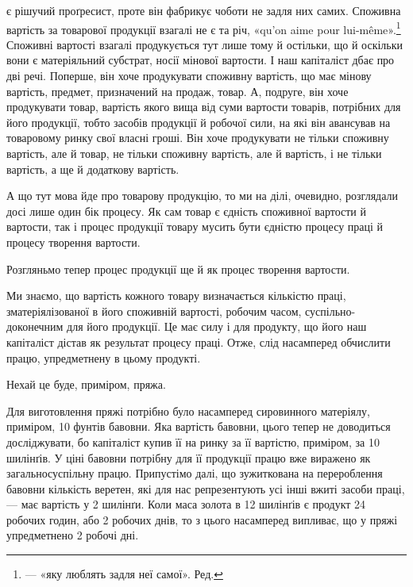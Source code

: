 \parcont{}  %
є рішучий проґресист, проте він фабрикує чоботи не задля них
самих. Споживна вартість за товарової продукції взагалі не є
та річ, «qu’on aime pour lui-même».\footnote*{
— «яку люблять задля неї самої». Ред.
} Споживні вартості взагалі
продукується тут лише тому й остільки, що й оскільки вони є
матеріяльний субстрат, носії мінової вартости. І наш капіталіст
дбає про дві речі. Поперше, він хоче продукувати споживну
вартість, що має мінову вартість, предмет, призначений на продаж,
товар. А, подруге, він хоче продукувати товар, вартість
якого вища від суми вартости товарів, потрібних для його продукції,
тобто засобів продукції й робочої сили, на які він авансував
на товаровому ринку свої власні гроші. Він хоче продукувати
не тільки споживну вартість, але й товар, не тільки споживну
вартість, але й вартість, і не тільки вартість, а ще й додаткову
вартість.

А що тут мова йде про товарову продукцію, то ми на ділі,
очевидно, розглядали досі лише один бік процесу. Як сам товар
є єдність споживної вартости й вартости, так і процес продукції
товару мусить бути єдністю процесу праці й процесу творення
вартости.

Розгляньмо тепер процес продукції ще й як процес творення
вартости.

Ми знаємо, що вартість кожного товару визначається кількістю
праці, зматеріялізованої в його споживній вартості, робочим
часом, суспільно-доконечним для його продукції. Це має силу
і для продукту, що його наш капіталіст дістав як результат процесу
праці. Отже, слід насамперед обчислити працю, упредметнену
в цьому продукті.

Нехай це буде, приміром, пряжа.

Для виготовлення пряжі потрібно було насамперед сировинного
матеріялу, приміром, 10 фунтів бавовни. Яка вартість бавовни,
цього тепер не доводиться досліджувати, бо капіталіст
купив її на ринку за її вартістю, приміром, за 10 шилінґів. У ціні
бавовни потрібну для її продукції працю вже виражено як загальносуспільну
працю. Припустімо далі, що зужиткована на
перероблення бавовни кількість веретен, які для нас репрезентують
усі інші вжиті засоби праці, — має вартість у 2 шилінґи.
Коли маса золота в 12 шилінґів є продукт 24 робочих годин, або
2    робочих днів, то з цього насамперед випливає, що у пряжі упредметнено
2 робочі дні.

